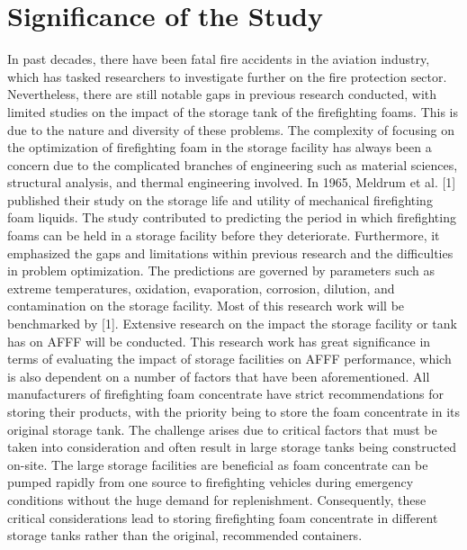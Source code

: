\section{Significance of the Study}
In past decades, there have been fatal fire accidents in the aviation industry, which has tasked researchers to investigate further on the fire protection sector. Nevertheless, there are still notable gaps in previous research conducted, with limited studies on the impact of the storage tank of the firefighting foams. This is due to the nature and diversity of these problems. The complexity of focusing on the optimization of firefighting foam in the storage facility has always been a concern due to the complicated branches of engineering such as material sciences, structural analysis, and thermal engineering involved. 
In 1965, Meldrum et al. [1] published their study on the storage life and utility of mechanical firefighting foam liquids. The study contributed to predicting the period in which firefighting foams can be held in a storage facility before they deteriorate. Furthermore, it emphasized the gaps and limitations within previous research and the difficulties in problem optimization. The predictions are governed by parameters such as extreme temperatures, oxidation, evaporation, corrosion, dilution, and contamination on the storage facility. Most of this research work will be benchmarked by [1]. Extensive research on the impact the storage facility or tank has on AFFF will be conducted.
This research work has great significance in terms of evaluating the impact of storage facilities on AFFF performance, which is also dependent on a number of factors that have been aforementioned. All manufacturers of firefighting foam concentrate have strict recommendations for storing their products, with the priority being to store the foam concentrate in its original storage tank. The challenge arises due to critical factors that must be taken into consideration and often result in large storage tanks being constructed on-site. The large storage facilities are beneficial as foam concentrate can be pumped rapidly from one source to firefighting vehicles during emergency conditions without the huge demand for replenishment. Consequently, these critical considerations lead to storing firefighting foam concentrate in different storage tanks rather than the original, recommended containers.


